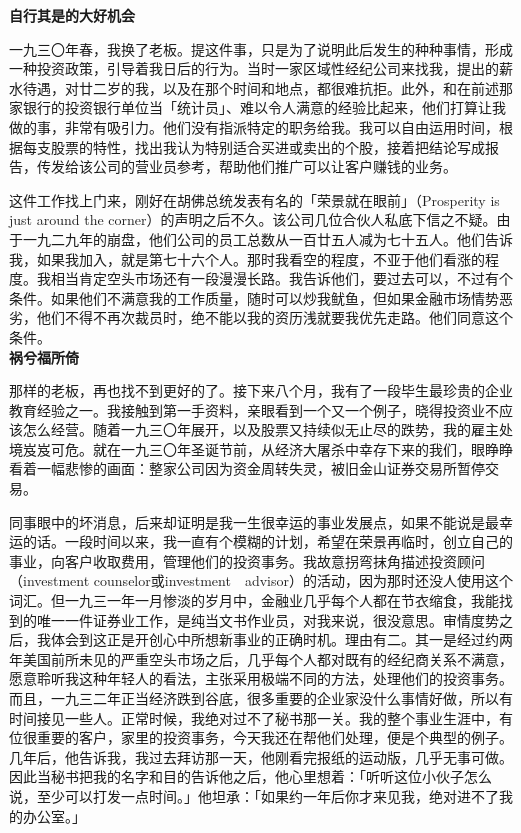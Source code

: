 \documentclass[UTF8,a4paper,zihao=-4,fontset = windows]{ctexart} %
\begin{document}
\textbf{自行其是的大好机会}


一九三〇年春，我换了老板。提这件事，只是为了说明此后发生的种种事情，形成一种投资政策，引导着我日后的行为。当时一家区域性经纪公司来找我，提出的薪水待遇，对廿二岁的我，以及在那个时间和地点，都很难抗拒。此外，和在前述那家银行的投资银行单位当「统计员」、难以令人满意的经验比起来，他们打算让我做的事，非常有吸引力。他们没有指派特定的职务给我。我可以自由运用时间，根据每支股票的特性，找出我认为特别适合买进或卖出的个股，接着把结论写成报告，传发给该公司的营业员参考，帮助他们推广可以让客户赚钱的业务。

这件工作找上门来，刚好在胡佛总统发表有名的「荣景就在眼前」（Prosperity is just around the corner）的声明之后不久。该公司几位合伙人私底下信之不疑。由于一九二九年的崩盘，他们公司的员工总数从一百廿五人减为七十五人。他们告诉我，如果我加入，就是第七十六个人。那时我看空的程度，不亚于他们看涨的程度。我相当肯定空头市场还有一段漫漫长路。我告诉他们，要过去可以，不过有个条件。如果他们不满意我的工作质量，随时可以炒我鱿鱼，但如果金融市场情势恶劣，他们不得不再次裁员时，绝不能以我的资历浅就要我优先走路。他们同意这个条件。
\\

\textbf{祸兮福所倚}


那样的老板，再也找不到更好的了。接下来八个月，我有了一段毕生最珍贵的企业教育经验之一。我接触到第一手资料，亲眼看到一个又一个例子，晓得投资业不应该怎么经营。随着一九三〇年展开，以及股票又持续似无止尽的跌势，我的雇主处境岌岌可危。就在一九三〇年圣诞节前，从经济大屠杀中幸存下来的我们，眼睁睁看着一幅悲惨的画面：整家公司因为资金周转失灵，被旧金山证券交易所暂停交易。

同事眼中的坏消息，后来却证明是我一生很幸运的事业发展点，如果不能说是最幸运的话。一段时间以来，我一直有个模糊的计划，希望在荣景再临时，创立自己的事业，向客户收取费用，管理他们的投资事务。我故意拐弯抹角描述投资顾问（investment counselor或investment　advisor）的活动，因为那时还没人使用这个词汇。但一九三一年一月惨淡的岁月中，金融业几乎每个人都在节衣缩食，我能找到的唯一一件证券业工作，是纯当文书作业员，对我来说，很没意思。审情度势之后，我体会到这正是开创心中所想新事业的正确时机。理由有二。其一是经过约两年美国前所未见的严重空头市场之后，几乎每个人都对既有的经纪商关系不满意，愿意聆听我这种年轻人的看法，主张采用极端不同的方法，处理他们的投资事务。而且，一九三二年正当经济跌到谷底，很多重要的企业家没什么事情好做，所以有时间接见一些人。正常时候，我绝对过不了秘书那一关。我的整个事业生涯中，有位很重要的客户，家里的投资事务，今天我还在帮他们处理，便是个典型的例子。几年后，他告诉我，我过去拜访那一天，他刚看完报纸的运动版，几乎无事可做。因此当秘书把我的名字和目的告诉他之后，他心里想着：「听听这位小伙子怎么说，至少可以打发一点时间。」他坦承：「如果约一年后你才来见我，绝对进不了我的办公室。」
\\
\end{document}
